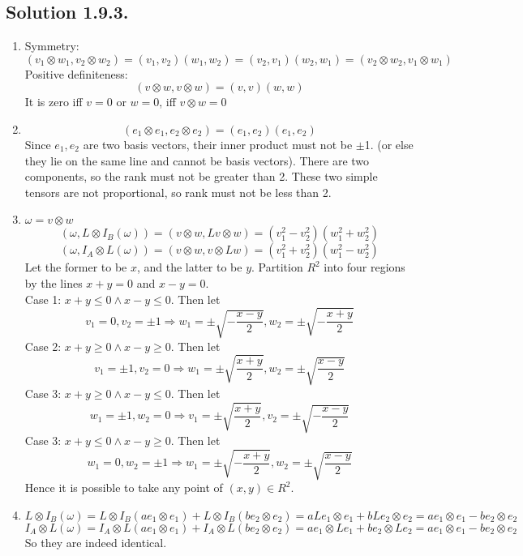 \documentclass{article}
\begin{document}
\subsection*{Solution 1.9.3.}
\begin{enumerate}
    \item
    Symmetry:
    \[(v_1\otimes w_1,v_2\otimes w_2) = (v_1,v_2)(w_1,w_2) = (v_2,v_1)(w_2,w_1) = (v_2\otimes w_2, v_1\otimes w_1)\]
    Positive definiteness:
    \[(v\otimes w, v\otimes w) = (v,v)(w,w)\]
    It is zero iff $v=0$ or $w=0$, iff $v\otimes w = 0$
    \item
    \[(e_1\otimes e_1, e_2 \otimes e_2) = (e_1,e_2)(e_1, e_2)\]
    Since $e_1, e_2$ are two basis vectors, their inner product must not be $\pm$1. (or else they lie on the same line and cannot be basis vectors).
    There are two components, so the rank must not be greater than 2. These two simple tensors are not proportional, so rank must not be less than 2.
    \item $\omega = v \otimes w$
    \[(\omega,L\otimes I_B(\omega)) = (v\otimes w, Lv \otimes w) = (v_1^2-v_2^2)(w_1^2+w_2^2)\]
    \[(\omega, I_A\otimes L(\omega)) = (v\otimes w, v \otimes Lw) = (v_1^2+v_2^2)(w_1^2-w_2^2)\]
    Let the former to be $x$, and the latter to be $y$. Partition $R^2$ into four regions by the lines $x+y = 0$ and $x - y = 0$.\\
    Case 1: $x + y \leq 0 \land x - y \leq 0$. Then let
    \[v_1=0, v_2=\pm 1 \Rightarrow w_1 = \pm\sqrt{-\frac{x-y}{2}}, w_2 = \pm\sqrt{-\frac{x+y}{2}}\]
    Case 2: $x +y \geq 0 \land x - y \geq 0$. Then let
    \[v_1 = \pm 1, v_2 = 0 \Rightarrow w_1 = \pm \sqrt{\frac{x+y}{2}}, w_2 = \pm \sqrt{\frac{x-y}{2}}\]
    Case 3: $x +y \geq 0 \land x - y \leq 0$. Then let
    \[w_1 = \pm 1, w_2 = 0 \Rightarrow v_1 = \pm \sqrt{\frac{x+y}{2}}, v_2 = \pm \sqrt{-\frac{x-y}{2}}\]
    Case 3: $x + y \leq 0 \land x - y \geq 0$. Then let
    \[w_1=0, w_2= \pm 1 \Rightarrow w_1 = \pm\sqrt{-\frac{x+y}{2}}, w_2 = \pm\sqrt{\frac{x-y}{2}}\]
    Hence it is possible to take any point of $(x,y)\in R^2$.
    \item
    \[L\otimes I_B(\omega) = L\otimes I_B(ae_1\otimes e_1) +L\otimes I_B(be_2\otimes e_2) = aLe_1\otimes e_1 + bLe_2 \otimes e_2 = ae_1\otimes e_1 - be_2\otimes e_2 \]
    \[I_A\otimes L(\omega) = I_A\otimes L(ae_1\otimes e_1) +I_A\otimes L(be_2\otimes e_2) = ae_1\otimes Le_1 + be_2 \otimes Le_2 = ae_1\otimes e_1 - be_2\otimes e_2\]
    So they are indeed identical.
\end{enumerate}
\end{document}
